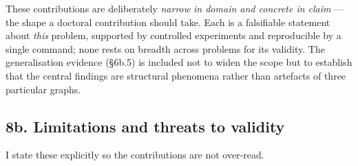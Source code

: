 \documentclass[
  11pt,
]{article}
\begin{document}
These contributions are deliberately \emph{narrow in domain and concrete
in claim} --- the shape a doctoral contribution should take. Each is a
falsifiable statement about \emph{this} problem, supported by controlled
experiments and reproducible by a single command; none rests on breadth
across problems for its validity. The generalisation evidence (§6b.5) is
included not to widen the scope but to establish that the central
findings are structural phenomena rather than artefacts of three
particular graphs.

\hypertarget{b.-limitations-and-threats-to-validity}{%
\subsection{8b. Limitations and threats to
validity}\label{b.-limitations-and-threats-to-validity}}

I state these explicitly so the contributions are not over-read.
\end{document}
